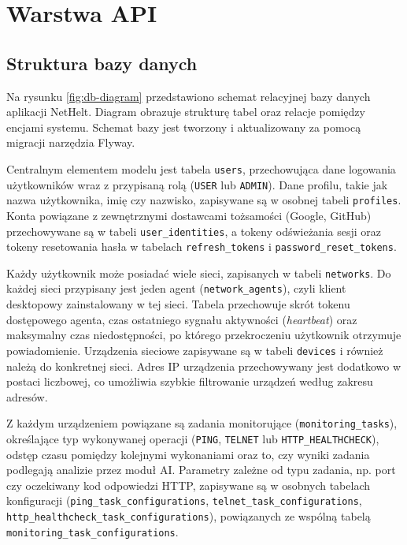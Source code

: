 \chapter{Warstwa API}
\label{chap:api}

\section{Struktura bazy danych}

Na rysunku \ref{fig:db-diagram} przedstawiono schemat relacyjnej bazy danych aplikacji NetHelt. Diagram obrazuje strukturę tabel oraz relacje pomiędzy encjami systemu. Schemat bazy jest tworzony i aktualizowany za pomocą migracji narzędzia Flyway.

Centralnym elementem modelu jest tabela \texttt{users}, przechowująca dane logowania użytkowników wraz z przypisaną rolą (\texttt{USER} lub \texttt{ADMIN}). Dane profilu, takie jak nazwa użytkownika, imię czy nazwisko, zapisywane są w osobnej tabeli \texttt{profiles}. Konta powiązane z zewnętrznymi dostawcami tożsamości (Google, GitHub) przechowywane są w tabeli \texttt{user\_identities}, a tokeny odświeżania sesji oraz tokeny resetowania hasła w tabelach \texttt{refresh\_tokens} i \texttt{password\_reset\_tokens}.

Każdy użytkownik może posiadać wiele sieci, zapisanych w tabeli \texttt{networks}. Do każdej sieci przypisany jest jeden agent (\texttt{network\_agents}), czyli klient desktopowy zainstalowany w tej sieci. Tabela przechowuje skrót tokenu dostępowego agenta, czas ostatniego sygnału aktywności (\emph{heartbeat}) oraz maksymalny czas niedostępności, po którego przekroczeniu użytkownik otrzymuje powiadomienie. Urządzenia sieciowe zapisywane są w tabeli \texttt{devices} i również należą do konkretnej sieci. Adres IP urządzenia przechowywany jest dodatkowo w postaci liczbowej, co umożliwia szybkie filtrowanie urządzeń według zakresu adresów.

Z każdym urządzeniem powiązane są zadania monitorujące (\texttt{monitoring\_tasks}), określające typ wykonywanej operacji (\texttt{PING}, \texttt{TELNET} lub \texttt{HTTP\_HEALTHCHECK}), odstęp czasu pomiędzy kolejnymi wykonaniami oraz to, czy wyniki zadania podlegają analizie przez moduł AI. Parametry zależne od typu zadania, np. port czy oczekiwany kod odpowiedzi HTTP, zapisywane są w osobnych tabelach konfiguracji (\texttt{ping\_task\_configurations}, \texttt{telnet\_task\_configurations}, \texttt{http\_healthcheck\_task\_configurations}), powiązanych ze wspólną tabelą \texttt{monitoring\_task\_configurations}.

